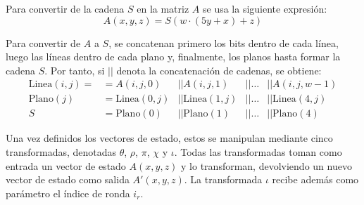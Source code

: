 Para convertir de la cadena \(S\) en la matriz \(A\) se usa la siguiente expresión:
\begin{equation}
	A(x,y,z)=S(w\cdot(5y+x)+z)
\end{equation}

Para convertir de \(A\) a \(S\), se concatenan primero los bits dentro de cada línea, luego las líneas dentro de cada plano y, finalmente, los planos hasta formar la cadena \(S\). Por tanto, si \(||\) denota la concatenación de cadenas, se obtiene:
\begin{equation}
	\begin{array}{lllll}
		\text{Linea}(i,j)=&=A(i,j,0)&||A(i,j,1)&|| \hdots &|| A(i,j,w-1)\\
		\text{Plano}(j)&=\text{Linea}(0,j)&||\text{Linea}(1,j)&|| \hdots &||   \text{Linea}(4,j)\\
		S&=\text{Plano}(0)&||\text{Plano}(1)&||\hdots&|| \text{Plano}(4)
	\end{array}
\end{equation}

Una vez definidos los vectores de estado, estos se manipulan mediante cinco transformadas, denotadas \(\theta\), \(\rho\), \(\pi\), \(\chi\) y \(\iota\). Todas las transformadas toman como entrada un vector de estado \(A(x,y,z)\) y lo transforman, devolviendo un nuevo vector de estado como salida \(A'(x,y,z)\). La transformada $\iota$ recibe además como parámetro el índice de ronda \(i_r\).

